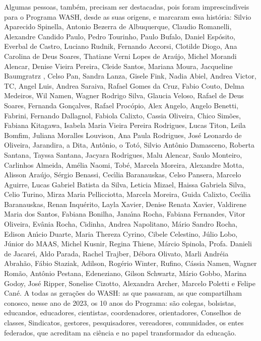 \begin{agradecimentos}
Algumas pessoas, tamb\'em, precisam ser destacadas, pois foram imprescind\'{\i}veis para o Programa WASH, desde as suas origens, e marcaram essa hist\'oria: Silvio Aparecido Spinella, Antonio Bezerra de Albuquerque, Claudio Romanelli, Alexandre Candido Paulo, Pedro Tourinho, Paulo Bufalo, Daniel Esp\'osito, Everbal de Castro, Luciano Rudnik, Fernando Accorsi, Clotilde Diogo, Ana Carolina de Deus Soares, Thatiane Verni Lopes de Ara\'ujo, Michel Morandi Alencar, Denise Vieira Pereira, Cleide Santos, Mariana Moura, Jacqueline Baumgratrz , Celso Pan, Sandra Lanza, Gisele Fink, Nadia Abiel, Andrea Victor, TC, Angel Luis, Andrea Saraiva, Rafael Gomes da Cruz, Fabio Couto, Delma Medeiros, Wil Namen, Wagner Rodrigo Silva, Glaucia Veloso, Rafael de Deus Soares, Fernanda Gon\c{c}alves, Rafael Proc\'opio, Alex Angelo, Angelo Benetti, Fabrini, Fernando Dallagnol, Fabiola Calixto, Cassia Oliveira, Chico Sim\~oes, Fabiana Kitagawa, Isabela Maria Vieira Pereira Rodrigues, Lucas Titon, Leila Bomfim, Juliana Moralles Louvison, Ana Paula Rodrigues, Jos\'e Leonardo de Oliveira, Jarandira, a Dita, Ant\^onio, o Tot\'o, Silvio Ant\^onio Damasceno, Roberta Santana, Tayssa Santana, Jacyara Rodrigues, Malu Alencar, Saulo Monteiro, Carlinhos Almeida, Am\'elia Naomi, Tob\'e, Marcela Moreira, Alexandre Motta, Alisson Ara\'ujo, S\'ergio Benassi, Cec\'{\i}lia Baranauskas, Celso Pansera, Marcelo Aguirre, Lucas Gabriel Batista da Silva, Leticia Mizael, Haissa Gabriela Silva, Celio Turino, Mirza Maria Pellicciotta, Marcela Moreira, Guida Calixto, Cec\'{\i}lia Baranauskas, Renan Inqu\'erito, Layla Xavier, Denise Renata Xavier, Valdirene Maria dos Santos, Fabiana Bonilha, Jana\'{\i}na Rocha, Fabiana Fernandes, Vitor Oliveira, Ev\^ania Rocha, Cidinha, Andrea Napolitano, M\'ario Sandro Rocha, Edison An\'{\i}cio Duarte, Maria Thereza Cyrino, Cibele Celestino, J\'ulio Lobo, J\'unior do MAAS, Michel Kusnir, Regina Thiene, M\'arcio Spinola, Profa. Danieli de Jacare\'{\i}, Aldo Parada, Rachel Trajber, D\'ebora Olivato, Marli Andr\'eia Abrah\~ao, F\'abio Staziak, Adilson, Rog\'erio Winter, Rufino, C\'assia Namen, Wagner Rom\~ao, Ant\^onio Pestana, Edeneziano, Gilson Schwartz, M\'ario Gobbo, Marina Godoy, Jos\'e Ripper, Sonelise Cizotto, Alexandra Archer, Marcelo Poletti e Felipe Can\'e.
A todas as gera\c{c}\~oes do WASH: as que passaram, as que compartilham conosco, nesse ano de 2023, os 10 anos do Programa: s\~ao colegas, bolsistas, educandos, educadores, cientistas, coordenadores, orientadores, Conselhos de classes, Sindicatos, gestores, pesquisadores, vereadores, comunidades, os entes federados, que acreditam na ci\^encia e no papel transformador da educa\c{c}\~ao.

\end{agradecimentos}
